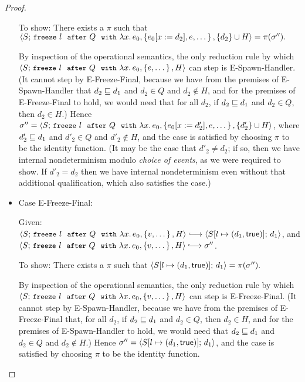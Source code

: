 \begin{proof}
\begin{itemize}
    To show: There exists a $\pi$ such that
    $\langle S;\, \mbox{\small{\texttt{freeze}}}~l~~{\mbox{\small{\texttt{after}}}}~Q~~{\mbox{\small{\texttt{with}}}}~\lambda x.\,e_0, \left\{e_0[x := d_2],
          e, \dots\right\}, \{d_2\}\cup H \rangle = \pi(\sigma'').$

    By inspection of the operational semantics, the only reduction
    rule by which
    $\langle S;\, \mbox{\small{\texttt{freeze}}}~l~~{\mbox{\small{\texttt{after}}}}~Q~~{\mbox{\small{\texttt{with}}}}~\lambda x.\,e_0, \left\{e,
          \dots\right\}, H \rangle$ can step is {\sc E-Spawn-Handler}.  (It cannot
    step by {\sc E-Freeze-Final}, because we have from the premises of
    {\sc E-Spawn-Handler} that $d_2 \sqsubseteq d_1$ and $d_2 \in Q$ and
    $d_2 \notin H$, and for the premises of {\sc E-Freeze-Final} to
    hold, we would need that for all $d_2$, if $d_2 \sqsubseteq d_1$ and
    $d_2 \in Q$, then $d_2 \in H$.)  Hence $\sigma'' =
    \langle S;\, \mbox{\small{\texttt{freeze}}}~l~~{\mbox{\small{\texttt{after}}}}~Q~~{\mbox{\small{\texttt{with}}}}~\lambda x.\,e_0, \left\{e_0[x := d'_2],
          e, \dots\right\}, \{d'_2\}\cup H \rangle$, where $d'_2 \sqsubseteq d_1$ and
    $d'_2 \in Q$ and $d'_2 \notin H$, and the case is satisfied by
    choosing $\pi$ to be the identity function.  (It may be the case
    that $d'_2 \neq d_2$; if so, then we have internal nondeterminism
    modulo \emph{choice of events}, as we were required to show.  If
    $d'_2 = d_2$ then we have internal nondeterminism even without
    that additional qualification, which also satisfies the case.)

  \item Case {\sc E-Freeze-Final}:

    Given: $\config{S}{\freezeafterfull{l}{Q}{\lam{x}{e_0}}{\setof{v,
          \dots}}{H}} \parstepsto
    \config{\extS{S}{l}{d_1}{\frozentrue}}{d_1}$, and
    $\config{S}{\freezeafterfull{l}{Q}{\lam{x}{e_0}}{\setof{v,
          \dots}}{H}} \parstepsto \conf''$.

    To show: There exists a $\pi$ such that
    $\langle S[l \mapsto (d_1, \textsf{true})];\, d_1 \rangle = \pi(\sigma'').$

    By inspection of the operational semantics, the only reduction
    rule by which
    $\langle S;\, \mbox{\small{\texttt{freeze}}}~l~~{\mbox{\small{\texttt{after}}}}~Q~~{\mbox{\small{\texttt{with}}}}~\lambda x.\,e_0, \left\{v,
          \dots\right\}, H \rangle$ can step is {\sc E-Freeze-Final}.  (It cannot
    step by {\sc E-Spawn-Handler}, because we have from the premises
    of {\sc E-Freeze-Final} that, for all $d_2$, if $d_2 \sqsubseteq d_1$
    and $d_2 \in Q$, then $d_2 \in H$, and for the premises of {\sc
      E-Spawn-Handler} to hold, we would need that $d_2 \sqsubseteq d_1$
    and $d_2 \in Q$ and $d_2 \notin H$.)  Hence $\sigma'' =
    \langle S[l \mapsto (d_1, \textsf{true})];\, d_1 \rangle$, and the case is
    satisfied by choosing $\pi$ to be the identity function.


\end{itemize}
\end{proof}
